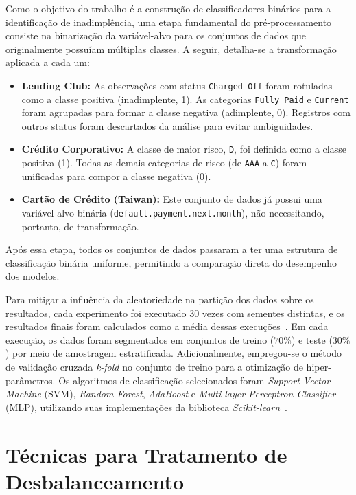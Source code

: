 Como o objetivo do trabalho é a construção de classificadores binários para a identificação de inadimplência, uma etapa fundamental do pré-processamento consiste na binarização da variável-alvo para os conjuntos de dados que originalmente possuíam múltiplas classes. A seguir, detalha-se a transformação aplicada a cada um:
\begin{itemize}
  \item \textbf{Lending Club:} As observações com status \texttt{Charged Off} foram rotuladas como a classe positiva (inadimplente, 1). As categorias \texttt{Fully Paid} e \texttt{Current} foram agrupadas para formar a classe negativa (adimplente, 0). Registros com outros status foram descartados da análise para evitar ambiguidades.
  \item \textbf{Crédito Corporativo:} A classe de maior risco, \texttt{D}, foi definida como a classe positiva (1). Todas as demais categorias de risco (de \texttt{AAA} a \texttt{C}) foram unificadas para compor a classe negativa (0).
  \item \textbf{Cartão de Crédito (Taiwan):} Este conjunto de dados já possui uma variável-alvo binária (\texttt{default.payment.next.month}), não necessitando, portanto, de transformação.
\end{itemize}
Após essa etapa, todos os conjuntos de dados passaram a ter uma estrutura de classificação binária uniforme, permitindo a comparação direta do desempenho dos modelos.

Para mitigar a influência da aleatoriedade na partição dos dados sobre os resultados, cada experimento foi executado \(30\) vezes com sementes distintas, e os resultados finais foram calculados como a média dessas execuções~\cite{Namvar2018}. Em cada execução, os dados foram segmentados em conjuntos de treino (\(70\%\)) e teste (\(30\%\)) por meio de amostragem estratificada. Adicionalmente, empregou-se o método de validação cruzada \textit{k-fold} no conjunto de treino para a otimização de hiper-parâmetros. Os algoritmos de classificação selecionados foram \textit{Support Vector Machine} (SVM), \textit{Random Forest}, \textit{AdaBoost} e \textit{Multi-layer Perceptron Classifier} (MLP), utilizando suas implementações da biblioteca \textit{Scikit-learn}~\cite{Pedregosa2011scikit}.

\section{Técnicas para Tratamento de Desbalanceamento}\label{sec:tecnicas}

